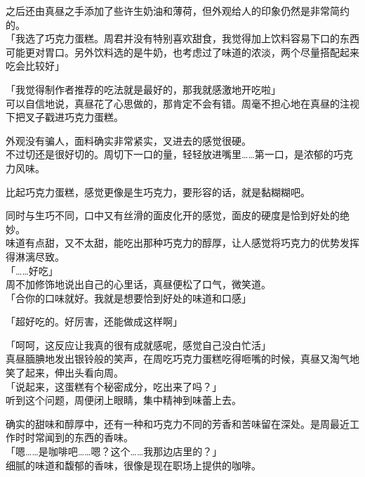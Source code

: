 之后还由真昼之手添加了些许生奶油和薄荷，但外观给人的印象仍然是非常简约的。\\

「我选了巧克力蛋糕。周君并没有特别喜欢甜食，我觉得加上饮料容易下口的东西可能更对胃口。另外饮料选的是牛奶，也考虑过了味道的浓淡，两个尽量搭配起来吃会比较好」

「我觉得制作者推荐的吃法就是最好的，那我就感激地开吃啦」\\

可以自信地说，真昼花了心思做的，那肯定不会有错。周毫不担心地在真昼的注视下把叉子戳进巧克力蛋糕。

外观没有骗人，面料确实非常紧实，叉进去的感觉很硬。\\

不过切还是很好切的。周切下一口的量，轻轻放进嘴里……第一口，是浓郁的巧克力风味。

比起巧克力蛋糕，感觉更像是生巧克力，要形容的话，就是黏糊糊吧。

同时与生巧不同，口中又有丝滑的面皮化开的感觉，面皮的硬度是恰到好处的绝妙。\\

味道有点甜，又不太甜，能吃出那种巧克力的醇厚，让人感觉将巧克力的优势发挥得淋漓尽致。\\

「……好吃」\\

周不加修饰地说出自己的心里话，真昼便松了口气，微笑道。\\

「合你的口味就好。我就是想要恰到好处的味道和口感」

「超好吃的。好厉害，还能做成这样啊」

「呵呵，这反应让我真的很有成就感呢，感觉自己没白忙活」\\

真昼腼腆地发出银铃般的笑声，在周吃巧克力蛋糕吃得咂嘴的时候，真昼又淘气地笑了起来，伸出头看向周。\\

「说起来，这蛋糕有个秘密成分，吃出来了吗？」\\

听到这个问题，周便闭上眼睛，集中精神到味蕾上去。

确实的甜味和醇厚中，还有一种和巧克力不同的芳香和苦味留在深处。是周最近工作时时常闻到的东西的香味。\\

「嗯……是咖啡吧……嗯？这个……我那边店里的？」\\

细腻的味道和馥郁的香味，很像是现在职场上提供的咖啡。\\

